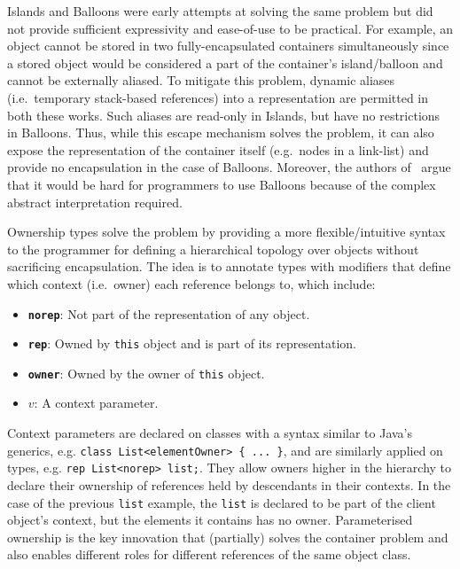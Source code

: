 \documentclass{acm_proc_article-sp}
\begin{document}
Islands and Balloons were early attempts at solving the same problem but did
not provide sufficient expressivity and ease-of-use to be practical. For
example, an object cannot be stored in two fully-encapsulated containers
simultaneously since a stored object would be considered a part of the
container's island/balloon and cannot be externally aliased. To mitigate this
problem, dynamic aliases (i.e.\ temporary stack-based references) into a
representation are permitted in both these works. Such aliases are read-only in
Islands, but have no restrictions in Balloons. Thus, while this escape
mechanism solves the problem, it can also expose the representation of the
container itself (e.g.\ nodes in a link-list) and provide no encapsulation in
the case of Balloons. Moreover, the authors of~\cite{noble98alias} argue that
it would be hard for programmers to use Balloons because of the complex
abstract interpretation required.

Ownership types solve the problem by providing a more flexible/intuitive syntax
to the programmer for defining a hierarchical topology over objects without
sacrificing encapsulation. The idea is to annotate types with modifiers
that define which context (i.e.\ owner) each reference belongs to, which
include:
\begin{itemize}
	\item \textbf{\lstinline|norep|}:
		Not part of the representation of any object.
	\item \textbf{\lstinline|rep|}:
		Owned by \lstinline|this| object and is part of its representation.
	\item \textbf{\lstinline|owner|}:
		Owned by the owner of \lstinline|this| object.
	\item \textbf{$v$}:
		A context parameter.
\end{itemize}

Context parameters are declared on classes with a syntax similar to Java's
generics, e.g. \lstinline|class List<elementOwner> { ... }|, and are similarly
applied on types, e.g. \lstinline|rep List<norep> list;|. They allow owners
higher in the hierarchy to declare their ownership of references held by
descendants in their contexts. In the case of the previous \lstinline|list|
example, the \lstinline|list| is declared to be part of the client object's
context, but the elements it contains has no owner. Parameterised ownership is
the key innovation that (partially) solves the container problem and also
enables different roles for different references of the same object class.
\end{document}
